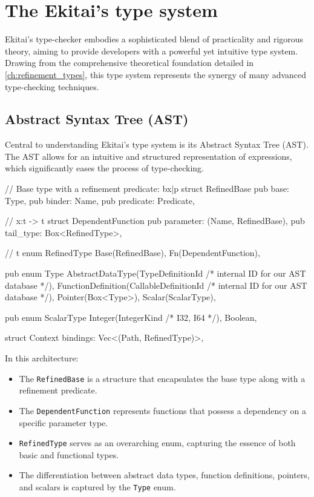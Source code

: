 \documentclass[
  oneside,
  english,
  coorientadorbanca,
  noabntexcite
]{ufsc-thesis-rn46-2019}
\begin{document}
\pagebreak

\section{The Ekitai's type system}

Ekitai's type-checker embodies a sophisticated blend of practicality and rigorous theory, aiming to provide developers with a powerful yet intuitive type system. Drawing from the comprehensive theoretical foundation detailed in \autoref{ch:refinement_types}, this type system represents the synergy of many advanced type-checking techniques.

\subsection{Abstract Syntax Tree (AST)}

Central to understanding Ekitai's type system is its Abstract Syntax Tree (AST). The AST allows for an intuitive and structured representation of expressions, which significantly eases the process of type-checking.

\begin{rustcode}
  // Base type with a refinement predicate: b{x|p}
  struct RefinedBase {
      pub base: Type,
      pub binder: Name,
      pub predicate: Predicate,
  }
  
  // x:t -> t
  struct DependentFunction {
      pub parameter: (Name, RefinedBase),
      pub tail_type: Box<RefinedType>,
  }
  
  // t
  enum RefinedType {
      Base(RefinedBase),
      Fn(DependentFunction),
  }
  
  pub enum Type {
      AbstractDataType(TypeDefinitionId /* internal ID for our AST database */),
      FunctionDefinition(CallableDefinitionId /* internal ID for our AST database */),
      Pointer(Box<Type>),
      Scalar(ScalarType),
  }
  
  pub enum ScalarType {
      Integer(IntegerKind /* I32, I64 */),
      Boolean,
  }
  
  struct Context {
      bindings: Vec<(Path, RefinedType)>,
  }  
\end{rustcode}
  
In this architecture:
\begin{itemize}
    \item The \texttt{RefinedBase} is a structure that encapsulates the base type along with a refinement predicate.
    \item The \texttt{DependentFunction} represents functions that possess a dependency on a specific parameter type.
    \item \texttt{RefinedType} serves as an overarching enum, capturing the essence of both basic and functional types.
    \item The differentiation between abstract data types, function definitions, pointers, and scalars is captured by the \texttt{Type} enum.
\end{itemize}
\end{document}
